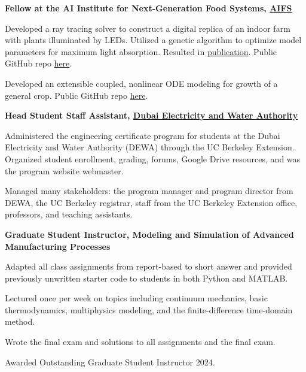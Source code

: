 \documentclass[letterpaper,10.8pt]{article}
\newcommand{\resumeItemNoTitle}[2]{\item\small{\textbf{#1}{ #2 \vspace{-2pt}}}}
\begin{document}
\resumeItemNoTitle{Fellow at the AI Institute for Next-Generation Food Systems, \href{https://aifs.ucdavis.edu/}{AIFS}}{}
\begin{description}[font=$\bullet$]
\item{Developed a ray tracing solver to construct a digital replica of an indoor farm with plants illuminated by LEDs. Utilized a genetic algorithm to optimize model parameters for maximum light absorption. Resulted in \href{https://doi.org/10.1007/s00466-023-02421-9}{publication}. Public GitHub repo \href{https://github.com/emremengi/INDOOR_FARMING_PAPER}{here}.}
\item{Developed an extensible coupled, nonlinear ODE modeling for growth of a general crop. Public GitHub repo \href{https://github.com/carlacupcake/smartfarm}{here}.}
\end{description} 

\resumeItemNoTitle{Head Student Staff Assistant, \href{https://engineering.berkeley.edu/news/2019/05/dubai-electricity-and-water-authority-partnership-advances-future-energy-educational-program/}{Dubai Electricity and Water Authority}}{}
\begin{description}[font=$\bullet$]
\item{Administered the engineering certificate program for students at the Dubai Electricity and Water Authority (DEWA) through the UC Berkeley Extension. Organized student enrollment, grading, forums, Google Drive resources, and was the program website webmaster.}
\item{Managed many stakeholders: the program manager and program director from DEWA, the UC Berkeley registrar, staff from the UC Berkeley Extension office, professors, and teaching assistants.}  
\end{description}  

\resumeItemNoTitle{Graduate Student Instructor, Modeling and Simulation of Advanced Manufacturing Processes}{}
\begin{description}[font=$\bullet$]
\item{Adapted all class assignments from report-based to short answer and provided previously unwritten starter code to students in both Python and MATLAB.}
\item{Lectured once per week on topics including continuum mechanics, basic thermodynamics, multiphysics modeling, and the finite-difference time-domain method.}  
\item{Wrote the final exam and solutions to all assignments and the final exam.}
\item{Awarded Outstanding Graduate Student Instructor 2024.}
\end{description} 
\end{document}
